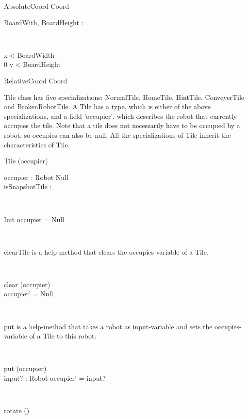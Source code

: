 \documentclass[12pt]{article}
\begin{document}
\begin{class}{AbsoluteCoord}
Coord \\
\begin{axdef}
BoardWith, BoardHeight : \nat
\end{axdef} \\
\begin{state}
 \leq x < BoardWidth \\
0 \leq y < BoardHeight
\end{state}
\end{class}

\begin{class}{RelativeCoord}
Coord \\
\end{class}

Tile class has five specializations: NormalTile, HomeTile, HintTile, ConveyerTile and BrokenRobotTile. A Tile has a type, which is either of the above specializations, and a field 'occupier', which describes the robot that currently occupies the tile. Note that a tile does not necessarily have to be occupied by a robot, so occupies can also be null. All the specializations of Tile inherit the characteristics of Tile.
\begin{class}{Tile}
\upharpoonright (occupier) \\
\begin{state}
occupier : Robot \cup Null \\
isSnapshotTile : \bool \\
\end{state} \\
\begin{schema}{Init}
occupier = Null
\end{schema} \\
\begin{classcom}
clearTile is a help-method that clears the occupies variable of a Tile.
\end{classcom} \\
\begin{schema}{clear}
\Delta (occupier) \\
\where
occupier' = Null
\end{schema} \\
\begin{classcom}
put is a help-method that takes a robot as input-variable and sets the occupies-variable of a Tile to this robot.
\end{classcom}\\
\begin{schema}{put}
\Delta (occupier) \\
input? : Robot
\where
occupier' = input?
\end{schema} \\
\begin{schema}{rotate}
\Delta()
\end{schema}
\end{class}
\end{document}
